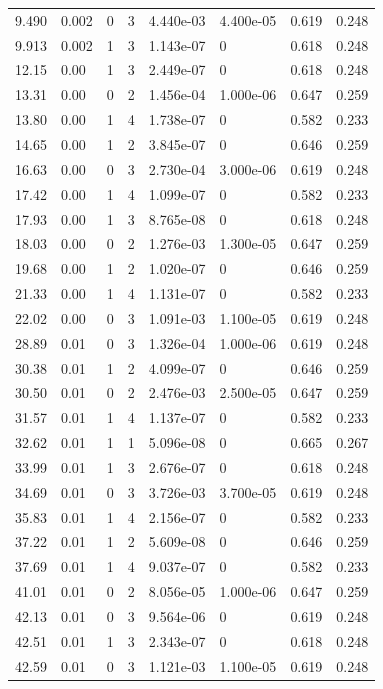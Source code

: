 \documentclass[preview]{standalone}
\begin{document}
{{\begin{tabular}{L{1.2cm}C{1.2cm} C{0.3cm}C{0.5cm} C{1.4cm}C{1.4cm} C{1.4cm}C{1.4cm}}
  9.490  &  0.002  & 0     &  3 &  4.440e-03  & 4.400e-05  & 0.619 &  0.248   \\ 
  9.913  &  0.002  & 1     &  3 &  1.143e-07  & 0  & 0.618 &  0.248   \\ 
  12.15  &  0.00  & 1     &  3 &  2.449e-07  & 0  & 0.618 &  0.248   \\ 
  13.31  &  0.00  & 0     &  2 &  1.456e-04  & 1.000e-06  & 0.647 &  0.259   \\ 
  13.80  &  0.00  & 1     &  4 &  1.738e-07  & 0  & 0.582 &  0.233   \\ 
  14.65  &  0.00  & 1     &  2 &  3.845e-07  & 0  & 0.646 &  0.259   \\ 
  16.63  &  0.00  & 0     &  3 &  2.730e-04  & 3.000e-06  & 0.619 &  0.248   \\ 
  17.42  &  0.00  & 1     &  4 &  1.099e-07  & 0  & 0.582 &  0.233   \\ 
  17.93  &  0.00  & 1     &  3 &  8.765e-08  & 0  & 0.618 &  0.248   \\ 
  18.03  &  0.00  & 0     &  2 &  1.276e-03  & 1.300e-05  & 0.647 &  0.259   \\ 
  19.68  &  0.00  & 1     &  2 &  1.020e-07  & 0  & 0.646 &  0.259   \\ 
  21.33  &  0.00  & 1     &  4 &  1.131e-07  & 0  & 0.582 &  0.233   \\ 
  22.02  &  0.00  & 0     &  3 &  1.091e-03  & 1.100e-05  & 0.619 &  0.248   \\ 
  28.89  &  0.01  & 0     &  3 &  1.326e-04  & 1.000e-06  & 0.619 &  0.248   \\ 
  30.38  &  0.01  & 1     &  2 &  4.099e-07  & 0  & 0.646 &  0.259   \\ 
  30.50  &  0.01  & 0     &  2 &  2.476e-03  & 2.500e-05  & 0.647 &  0.259   \\ 
  31.57  &  0.01  & 1     &  4 &  1.137e-07  & 0  & 0.582 &  0.233   \\ 
  32.62  &  0.01  & 1     &  1 &  5.096e-08  & 0  & 0.665 &  0.267   \\ 
  33.99  &  0.01  & 1     &  3 &  2.676e-07  & 0  & 0.618 &  0.248   \\ 
  34.69  &  0.01  & 0     &  3 &  3.726e-03  & 3.700e-05  & 0.619 &  0.248   \\ 
  35.83  &  0.01  & 1     &  4 &  2.156e-07  & 0  & 0.582 &  0.233   \\ 
  37.22  &  0.01  & 1     &  2 &  5.609e-08  & 0  & 0.646 &  0.259   \\ 
  37.69  &  0.01  & 1     &  4 &  9.037e-07  & 0  & 0.582 &  0.233   \\ 
  41.01  &  0.01  & 0     &  2 &  8.056e-05  & 1.000e-06  & 0.647 &  0.259   \\ 
  42.13  &  0.01  & 0     &  3 &  9.564e-06  & 0  & 0.619 &  0.248   \\ 
  42.51  &  0.01  & 1     &  3 &  2.343e-07  & 0  & 0.618 &  0.248   \\ 
  42.59  &  0.01  & 0     &  3 &  1.121e-03  & 1.100e-05  & 0.619 &  0.248   \\ 
\hline 
\end{tabular} 

}}
\end{document}
